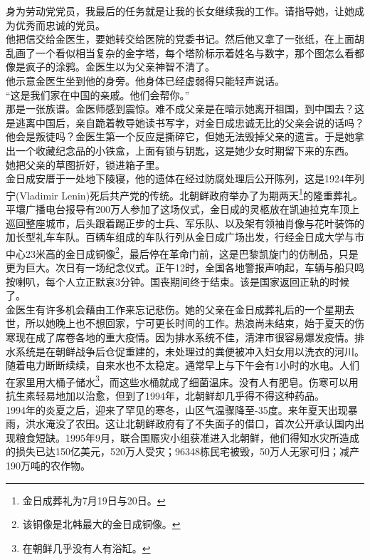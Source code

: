 身为劳动党党员，我最后的任务就是让我的长女继续我的工作。请指导她，让她成为优秀而忠诚的党员。\\

他把信交给金医生，要她转交给医院的党委书记。然后他又拿了一张纸，在上面胡乱画了一个看似相当复杂的金字塔，每个塔阶标示着姓名与数字，那个图怎么看都像是疯子的涂鸦。金医生以为父亲神智不清了。\\

他示意金医生坐到他的身旁。他身体已经虚弱得只能轻声说话。\\

“这是我们家在中国的亲戚。他们会帮你。”\\

那是一张族谱。金医师感到震惊。难不成父亲是在暗示她离开祖国，到中国去？这是逃离中国后，亲自跪着教导她读书写字，对金日成忠诚无比的父亲会说的话吗？他会是叛徒吗？金医生第一个反应是撕碎它，但她无法毁掉父亲的遗言。于是她拿出一个收藏纪念品的小铁盒，上面有锁与钥匙，这是她少女时期留下来的东西。\\

她把父亲的草图折好，锁进箱子里。\\

金日成安厝于一处地下陵寝，他的遗体在经过防腐处理后公开陈列，这是1924年列宁(Vladimir Lenin)死后共产党的传统。北朝鲜政府举办了为期两天\footnote{金日成葬礼为7月19日与20日。}的隆重葬礼。平壤广播电台报导有200万人参加了这场仪式，金日成的灵柩放在凯迪拉克车顶上巡回整座城市，后头跟着踢正步的士兵、军乐队、以及架有领袖肖像与花叶装饰的加长型礼车车队。百辆车组成的车队行列从金日成广场出发，行经金日成大学与市中心23米高的金日成铜像\footnote{该铜像是北韩最大的金日成铜像。}，最后停在革命门前，这是巴黎凯旋门的仿制品，只是更为巨大。次日有一场纪念仪式。正午12时，全国各地警报声响起，车辆与船只鸣按喇叭，每个人立正默哀3分钟。国丧期间终于结束。该是国家返回正轨的时候了。\\

金医生有许多机会藉由工作来忘记悲伤。她的父亲在金日成葬礼后的一个星期去世，所以她晚上也不想回家，宁可更长时间的工作。热浪尚未结束，始于夏天的伤寒现在成了席卷各地的重大疫情。因为排水系统不佳，清津市很容易爆发疫情。排水系统是在朝鲜战争后仓促重建的，未处理过的粪便被冲入妇女用以洗衣的河川。随着电力断断续续，自来水也不太稳定。通常早上与下午会有1小时的水电。人们在家里用大桶子储水\footnote{在朝鲜几乎没有人有浴缸。}，而这些水桶就成了细菌温床。没有人有肥皂。伤寒可以用抗生素轻易地加以治愈，但到了1994年，北朝鲜却几乎得不得这种药品。\\

1994年的炎夏之后，迎来了罕见的寒冬，山区气温骤降至-35度。来年夏天出现暴雨，洪水淹没了农田。这让北朝鲜政府有了不失面子的借口，首次公开承认国内出现粮食短缺。1995年9月，联合国赈灾小组获准进入北朝鲜，他们得知水灾所造成的损失已达150亿美元，520万人受灾；96348栋民宅被毁，50万人无家可归；减产190万吨的农作物。\\

